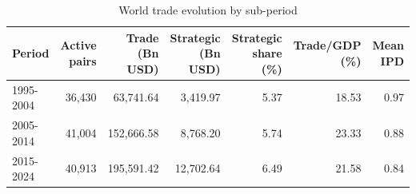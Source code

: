 \begin{table}[!h]
\centering
\caption{\label{tab:tab:evolution}World trade evolution by sub-period}
\centering
\begin{tabular}[t]{lrrrrrr}
\toprule
Period & Active pairs & Trade (Bn USD) & Strategic (Bn USD) & Strategic share (\%) & Trade/GDP (\%) & Mean IPD\\
\midrule
1995-2004 & 36,430 & 63,741.64 & 3,419.97 & 5.37 & 18.53 & 0.97\\
2005-2014 & 41,004 & 152,666.58 & 8,768.20 & 5.74 & 23.33 & 0.88\\
2015-2024 & 40,913 & 195,591.42 & 12,702.64 & 6.49 & 21.58 & 0.84\\
\bottomrule
\end{tabular}
\end{table}
